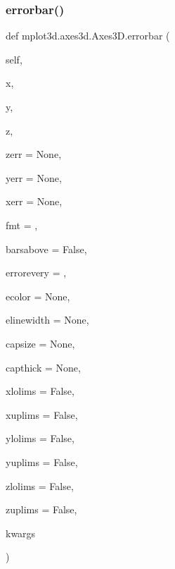 \subsubsection{\texorpdfstring{errorbar()}{errorbar()}}
{\footnotesize\ttfamily def mplot3d.\+axes3d.\+Axes3\+D.\+errorbar (\begin{DoxyParamCaption}\item[{}]{self,  }\item[{}]{x,  }\item[{}]{y,  }\item[{}]{z,  }\item[{}]{zerr = {\ttfamily None},  }\item[{}]{yerr = {\ttfamily None},  }\item[{}]{xerr = {\ttfamily None},  }\item[{}]{fmt = {\ttfamily \textquotesingle{}\textquotesingle{}},  }\item[{}]{barsabove = {\ttfamily False},  }\item[{}]{errorevery = {},  }\item[{}]{ecolor = {\ttfamily None},  }\item[{}]{elinewidth = {\ttfamily None},  }\item[{}]{capsize = {\ttfamily None},  }\item[{}]{capthick = {\ttfamily None},  }\item[{}]{xlolims = {\ttfamily False},  }\item[{}]{xuplims = {\ttfamily False},  }\item[{}]{ylolims = {\ttfamily False},  }\item[{}]{yuplims = {\ttfamily False},  }\item[{}]{zlolims = {\ttfamily False},  }\item[{}]{zuplims = {\ttfamily False},  }\item[{}]{kwargs }\end{DoxyParamCaption})}

